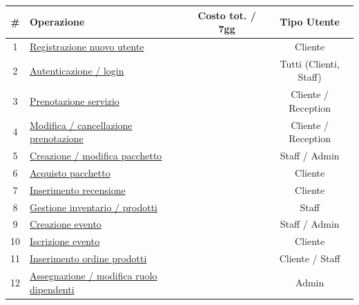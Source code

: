 \documentclass[a4paper,12pt]{report}
\begin{document}
\begin{table}[H]
	\centering
	\small
	\renewcommand{\arraystretch}{1.12}
	\begin{tabularx}{\textwidth}{|c|>{\raggedright\arraybackslash}X|c|c|}
		\hline
		\rowcolor{gray!20}
		\textbf{\#} & \textbf{Operazione}                                                    & \textbf{Costo tot. / 7gg} & \textbf{Tipo Utente}   \\
		\hline
		1           & \hyperref[op1]{Registrazione nuovo utente}                             &                           & Cliente                \\
		\hline
		2           & \hyperref[op2]{Autenticazione / login}                                 &                           & Tutti (Clienti, Staff) \\
		\hline
		3           & \hyperref[op3]{Prenotazione servizio}                                  &                           & Cliente / Reception    \\
		\hline
		4           & \hyperref[op4]{Modifica / cancellazione prenotazione}                  &                           & Cliente / Reception    \\
		\hline
		5           & \hyperref[op5]{Creazione / modifica pacchetto}                         &                           & Staff / Admin          \\
		\hline
		6           & \hyperref[op6]{Acquisto pacchetto}                                     &                           & Cliente                \\
		\hline
		7           & \hyperref[op7]{Inserimento recensione}                                 &                           & Cliente                \\
		\hline
		8           & \hyperref[op8]{Gestione inventario / prodotti}                         &                           & Staff                  \\
		\hline
		9           & \hyperref[op9]{Creazione evento}                                       &                           & Staff / Admin          \\
		\hline
		10          & \hyperref[op10]{Iscrizione evento}                                     &                           & Cliente                \\
		\hline
		11          & \hyperref[op11]{Inserimento ordine prodotti}                           &                           & Cliente / Staff        \\
		\hline
		12          & \hyperref[op12]{Assegnazione / modifica ruolo dipendenti}              &                           & Admin                  \\

\end{tabularx}
\end{table}
\end{document}
